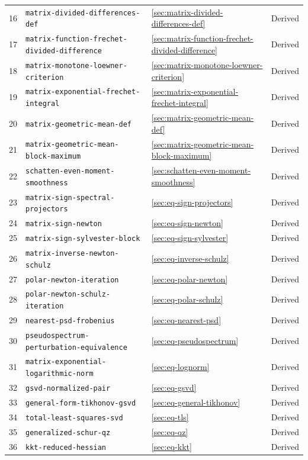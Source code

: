 \documentclass[11pt,a4paper]{article}
\DeclareRobustCommand{\code}[1]{{\footnotesize\urlstyle{tt}\nolinkurl{#1}}}
\begin{document}
\begin{longtable}{@{}r p{} l l@{}}
16 & \code{matrix-divided-differences-def} & \ref{sec:matrix-divided-differences-def} & Derived \\
17 & \code{matrix-function-frechet-divided-difference} & \ref{sec:matrix-function-frechet-divided-difference} & Derived \\
18 & \code{matrix-monotone-loewner-criterion} & \ref{sec:matrix-monotone-loewner-criterion} & Derived \\
19 & \code{matrix-exponential-frechet-integral} & \ref{sec:matrix-exponential-frechet-integral} & Derived \\
20 & \code{matrix-geometric-mean-def} & \ref{sec:matrix-geometric-mean-def} & Derived \\
21 & \code{matrix-geometric-mean-block-maximum} & \ref{sec:matrix-geometric-mean-block-maximum} & Derived \\
22 & \code{schatten-even-moment-smoothness} & \ref{sec:schatten-even-moment-smoothness} & Derived \\
23 & \code{matrix-sign-spectral-projectors} & \ref{sec:eq-sign-projectors} & Derived \\
24 & \code{matrix-sign-newton} & \ref{sec:eq-sign-newton} & Derived \\
25 & \code{matrix-sign-sylvester-block} & \ref{sec:eq-sign-sylvester} & Derived \\
26 & \code{matrix-inverse-newton-schulz} & \ref{sec:eq-inverse-schulz} & Derived \\
27 & \code{polar-newton-iteration} & \ref{sec:eq-polar-newton} & Derived \\
28 & \code{polar-newton-schulz-iteration} & \ref{sec:eq-polar-schulz} & Derived \\
29 & \code{nearest-psd-frobenius} & \ref{sec:eq-nearest-psd} & Derived \\
30 & \code{pseudospectrum-perturbation-equivalence} & \ref{sec:eq-pseudospectrum} & Derived \\
31 & \code{matrix-exponential-logarithmic-norm} & \ref{sec:eq-lognorm} & Derived \\
32 & \code{gsvd-normalized-pair} & \ref{sec:eq-gsvd} & Derived \\
33 & \code{general-form-tikhonov-gsvd} & \ref{sec:eq-general-tikhonov} & Derived \\
34 & \code{total-least-squares-svd} & \ref{sec:eq-tls} & Derived \\
35 & \code{generalized-schur-qz} & \ref{sec:eq-qz} & Derived \\
36 & \code{kkt-reduced-hessian} & \ref{sec:eq-kkt} & Derived \\

\end{longtable}
\end{document}
